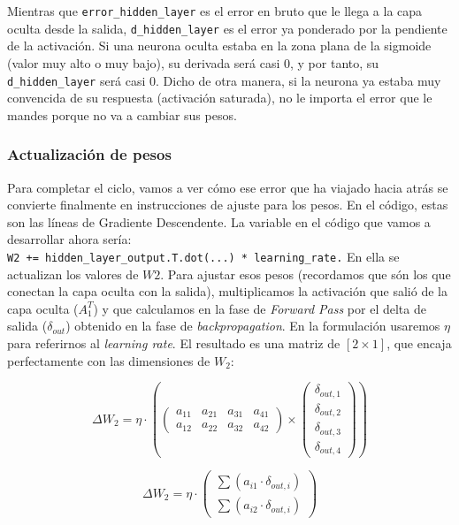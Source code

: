 \documentclass[a4paper,11pt]{article}
\renewenvironment{equation}{\begin{equation*}}{\end{equation*}}
\let\oldequation\equation
\let\endoldequation\endequation
\renewenvironment{equation}
  {\vspace{0.5em}\oldequation}
  {\endoldequation\vspace{0.5em}}
\begin{document}
Mientras que \texttt{error\_hidden\_layer} es el error en bruto que le
llega a la capa oculta desde la salida, \texttt{d\_hidden\_layer} es el
error ya ponderado por la pendiente de la activación. Si una neurona
oculta estaba en la zona plana de la sigmoide (valor muy alto o muy
bajo), su derivada será casi 0, y por tanto, su
\texttt{d\_hidden\_layer} será casi 0. Dicho de otra manera, si la
neurona ya estaba muy convencida de su respuesta (activación saturada),
no le importa el error que le mandes porque no va a cambiar sus pesos.


\subsubsection{Actualización de pesos}

Para completar el ciclo, vamos a ver cómo ese error que ha viajado hacia
atrás se convierte finalmente en instrucciones de ajuste para los pesos.
En el código, estas son las líneas de Gradiente Descendente. La variable
en el código que vamos a desarrollar ahora sería:
\texttt{W2\ +=\ hidden\_layer\_output.T.dot(...)\ *\ learning\_rate.}
En ella se actualizan los valores de \(W2\). Para ajustar esos pesos
(recordamos que són los que conectan la capa oculta con la salida),
multiplicamos la activación que salió de la capa oculta (\(A_1^T\)) y
que calculamos en la fase de \emph{Forward Pass} por el delta de salida
(\(\delta_{out}\)) obtenido en la fase de \emph{backpropagation}. En la
formulación usaremos \(\eta\) para referirnos al \emph{learning rate}.
El resultado es una matriz de \([2 \times 1]\), que encaja perfectamente
con las dimensiones de \(W_2\):

\begin{equation}\Delta W_2 = \eta \cdot \left( \begin{pmatrix} a_{11} & a_{21} & a_{31} & a_{41} \\ a_{12} & a_{22} & a_{32} & a_{42} \end{pmatrix} \times \begin{pmatrix} \delta_{out,1} \\ \delta_{out,2} \\ \delta_{out,3} \\ \delta_{out,4} \end{pmatrix} \right)\end{equation}

\begin{equation}\Delta W_2 = \eta \cdot \begin{pmatrix} \sum (a_{i1} \cdot \delta_{out,i}) \\ \sum (a_{i2} \cdot \delta_{out,i}) \end{pmatrix}\end{equation}
\end{document}

